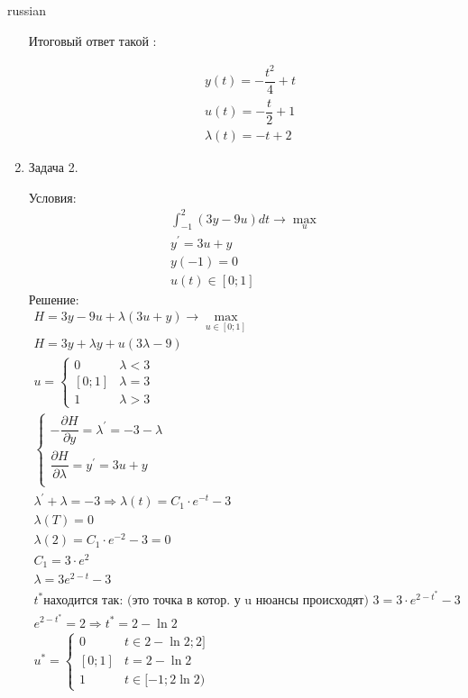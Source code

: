 \documentclass{article}
\begin{document}
\begin{otherlanguage*}{russian}
\begin{enumerate}
Итоговый ответ такой :

\begin{align*}
&y(t) = - \dfrac{t^2}{4} + t \\
&u(t) = - \dfrac{t}{2} + 1 \\
&\lambda (t) = - t + 2 
\end{align*}

\item Задача 2. 

Условия:
\begin{align*}
\int_{-1}^2 (3 y - 9 u ) dt \rightarrow \max_{u} \\
y^{'} = 3 u + y \\
y(-1) = 0 \\
u(t) \in [0; 1] 
\end{align*}
Решение:
\begin{align*}
H = 3 y - 9 u + \lambda (3 u + y ) \rightarrow \max_{u \in [0;1] } \\
H = 3 y + \lambda y + u ( 3\lambda - 9 ) \\
u = \begin{cases} 
0 & \lambda < 3 \\
[0; 1] & \lambda = 3 \\
1 & \lambda > 3 
\end{cases} \\
\begin{cases} 
- \dfrac{ \partial H}{\partial y} = \lambda^{'} = - 3 - \lambda \\
\dfrac{\partial H}{\partial \lambda} = y ^{'} = 3 u + y \\
\end{cases} \\
\lambda^{'} + \lambda = - 3 \Rightarrow \lambda (t) = C_1 \cdot e ^{-t} - 3 \\
\lambda (T) = 0 \\
\lambda(2) = C_1 \cdot e ^{-2} - 3 = 0 \\
C_1 = 3 \cdot e ^ 2 \\
\lambda = 3 e ^{2 - t } - 3 \\
t^* \text{находится так: (это точка в котор. у u нюансы происходят) } 3 = 3 \cdot e ^ {2 - t ^* } - 3 \\
e ^{2 - t ^* } = 2 \Rightarrow t^* = 2 - \ln 2 \\
u^* = \begin{cases}
0 & t \in 2 - \ln 2; 2 ] \\
[0; 1]  & t = 2 - \ln 2 \\ 
1 & t \in [-1; 2 \ln 2) 
\end{cases} 
\end{align*}


\end{enumerate}
\end{otherlanguage*}
\end{document}
